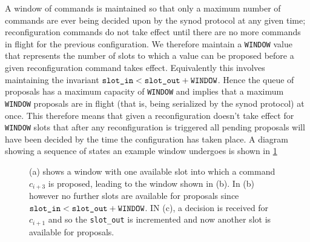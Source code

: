 A window of commands is maintained so that only a maximum number of commands are ever being decided upon by the synod protocol at any given time; reconfiguration commands do not take effect until there are no more commands in flight for the previous configuration. We therefore maintain a \texttt{WINDOW} value that represents the number of slots to which a value can be proposed before a given reconfiguration command takes effect. Equivalently this involves maintaining the invariant $ \textrm{\texttt{slot\_in}} < \textrm{\texttt{slot\_out}} + \textrm{\texttt{WINDOW}} $. Hence the queue of proposals has a maximum capacity of \texttt{WINDOW} and implies that a maximum \texttt{WINDOW} proposals are in flight (that is, being serialized by the synod protocol) at once. This therefore means that given a reconfiguration doesn't take effect for \texttt{WINDOW} slots that after any reconfiguration is triggered all pending proposals will have been decided by the time the configuration has taken place. A diagram showing a sequence of states an example window undergoes is shown in \ref{fig:replica-window}\\

\begin{figure}
  \centering
    \scalebox{0.8}{
      
    }
  \caption{(a) shows a window with one available slot into which a command $c_{i+3}$ is proposed, leading to the window shown in (b). In (b) however no further slots are available for proposals since $ \textrm{\texttt{slot\_in}} < \textrm{\texttt{slot\_out}} + \textrm{\texttt{WINDOW}} $. IN (c), a decision is received for $c_{i+1}$ and so the \texttt{slot\_out} is incremented and now another slot is available for proposals.}
  \label{fig:replica-window}  
\end{figure}



